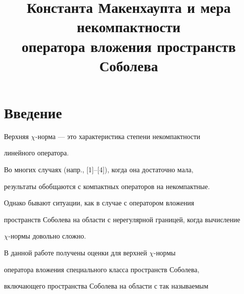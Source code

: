 \title{Константа Макенхаупта и мера некомпактности\\


оператора вложения пространств Соболева}





\date{}







\pagestyle{plain} %













\maketitle


\label{begin}








\section*{Введение}





Верхняя $\chi$-норма --- это характеристика степени некомпактности


линейного оператора.


Во многих случаях (напр., [1]--[4]), когда она достаточно мала,


результаты обобщаются с компактных операторов на некомпактные.


Однако бывают ситуации, как в случае с оператором вложения


пространств Соболева на области с нерегулярной границей, когда вычисление


$\chi$-нормы довольно сложно.





В данной работе получены оценки для верхней $\chi$-нормы


оператора вложения специального класса пространств Соболева,


включающего пространства Соболева на области с так называемым


